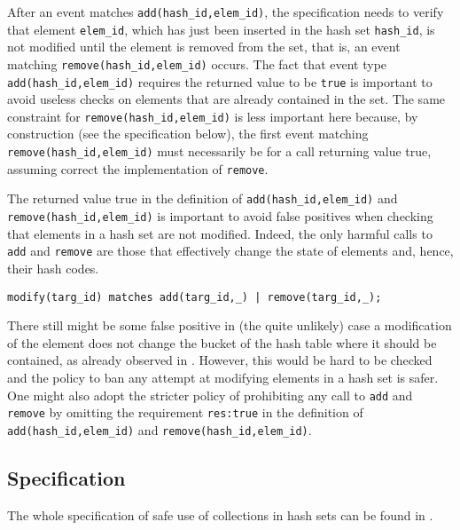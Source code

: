 After an event matches \lstinline{add(hash_id,elem_id)}, the specification needs to verify that 
element \lstinline{elem_id}, which has just been inserted in the hash set \lstinline{hash_id}, is not modified 
until the element is removed from the set, that is, an event matching \lstinline{remove(hash_id,elem_id)} occurs.
The fact that event type \lstinline{add(hash_id,elem_id)} requires the returned value to be \lstinline{true} is important to avoid
useless checks on elements that are already contained in the set. The same constraint for \lstinline{remove(hash_id,elem_id)} is less important here
because, by construction (see the specification below), the first event matching \lstinline{remove(hash_id,elem_id)} must necessarily be for a call returning value true, assuming correct the implementation of \lstinline{remove}.

The returned value true in the definition of  \lstinline{add(hash_id,elem_id)} and \lstinline{remove(hash_id,elem_id)} is important to avoid false positives when checking that elements in a hash set are not modified. Indeed, the only harmful calls to \lstinline{add} and
\lstinline{remove} are those that effectively change the state of elements and, hence, their hash codes.
\begin{lstlisting}[basicstyle=\ttfamily\scriptsize]
modify(targ_id) matches add(targ_id,_) | remove(targ_id,_);
\end{lstlisting}
There still might be some false positive in (the quite unlikely) case a modification of the element does not change the bucket of the hash table
where it should be contained, as already observed in . However, this would be hard to be checked and the policy to ban any attempt at modifying elements in a hash set is safer. One might also adopt the stricter policy of prohibiting any call to \lstinline{add} and \lstinline{remove} by omitting the requirement \lstinline{res:true} in the definition of \lstinline{add(hash_id,elem_id)} and \lstinline{remove(hash_id,elem_id)}.

\subsection{Specification}
The whole specification of safe use of collections in hash sets can be found in .


